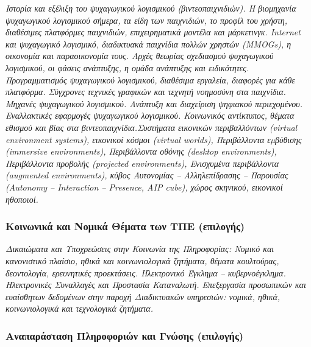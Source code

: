 \emph{Ιστορία και εξέλιξη του ψυχαγωγικού λογισμικού (βιντεοπαιχνιδιών).
Η βιομηχανία ψυχαγωγικού λογισμικού σήμερα, τα είδη των παιχνιδιών, το
προφίλ του χρήστη, διαθέσιμες πλατφόρμες παιχνιδιών, επιχειρηματικά
μοντέλα και μάρκετινγκ. Internet και ψυχαγωγικό λογισμικό, διαδικτυακά
παιχνίδια πολλών χρηστών (MMOGs), η οικονομία και παραοικονομία τους.
Αρχές θεωρίας σχεδιασμού ψυχαγωγικού λογισμικού, οι φάσεις ανάπτυξης, η
ομάδα ανάπτυξης και ειδικότητες. Προγραμματισμός ψυχαγωγικού λογισμικού,
διαθέσιμα εργαλεία, διαφορές για κάθε πλατφόρμα. Σύγχρονες τεχνικές
γραφικών και τεχνητή νοημοσύνη στα παιχνίδια. Μηχανές ψυχαγωγικού
λογισμικού. Ανάπτυξη και διαχείριση ψηφιακού περιεχομένου. Εναλλακτικές
εφαρμογές ψυχαγωγικού λογισμικού. Κοινωνικός αντίκτυπος, θέματα εθισμού
και βίας στα βιντεοπαιχνίδια.Συστήματα εικονικών περιβαλλόντων (virtual
environment systems), εικονικοί κόσμοι (virtual worlds), Περιβάλλοντα
εµβύθισης (immersive environments), Περιβάλλοντα οθόνης (desktop
environments), Περιβάλλοντα προβολής (projected environments),
Ενισχυμένα περιβάλλοντα (augmented environments), κύβος Αυτονομίας --
Αλληλεπίδρασης -- Παρουσίας (Autonomy -- Interaction -- Presence, AIP
cube), χώρος σκηνικού, εικονικοί ηθοποιοί.}

\hypertarget{ux3baux3bfux3b9ux3bdux3c9ux3bdux3b9ux3baux3ac-ux3baux3b1ux3b9-ux3bdux3bfux3bcux3b9ux3baux3ac-ux3b8ux3adux3bcux3b1ux3c4ux3b1-ux3c4ux3c9ux3bd-ux3c4ux3c0ux3b5-ux3b5ux3c0ux3b9ux3bbux3bfux3b3ux3aeux3c2}{%
\subsubsection{Κοινωνικά και Νομικά Θέματα των ΤΠΕ
(επιλογής)}\label{ux3baux3bfux3b9ux3bdux3c9ux3bdux3b9ux3baux3ac-ux3baux3b1ux3b9-ux3bdux3bfux3bcux3b9ux3baux3ac-ux3b8ux3adux3bcux3b1ux3c4ux3b1-ux3c4ux3c9ux3bd-ux3c4ux3c0ux3b5-ux3b5ux3c0ux3b9ux3bbux3bfux3b3ux3aeux3c2}}

\emph{Δικαιώματα και Υποχρεώσεις στην Κοινωνία της Πληροφορίας: Νομικό
και κανονιστικό πλαίσιο, ηθικά και κοινωνιολογικά ζητήματα, θέματα
κουλτούρας, δεοντολογία, ερευνητικές προεκτάσεις. Ηλεκτρονικό Έγκλημα --
κυβερνοέγκλημα. Ηλεκτρονικές Συναλλαγές και Προστασία Καταναλωτή.
Επεξεργασία προσωπικών και ευαίσθητων δεδομένων στην παροχή Διαδικτυακών
υπηρεσιών: νομικά, ηθικά, κοινωνιολογικά και τεχνολογικά ζητήματα.}

\hypertarget{ux3b1ux3bdux3b1ux3c0ux3b1ux3c1ux3acux3c3ux3c4ux3b1ux3c3ux3b7-ux3c0ux3bbux3b7ux3c1ux3bfux3c6ux3bfux3c1ux3b9ux3ceux3bd-ux3baux3b1ux3b9-ux3b3ux3bdux3ceux3c3ux3b7ux3c2-ux3b5ux3c0ux3b9ux3bbux3bfux3b3ux3aeux3c2}{%
\subsubsection{Αναπαράσταση Πληροφοριών και Γνώσης
(επιλογής)}\label{ux3b1ux3bdux3b1ux3c0ux3b1ux3c1ux3acux3c3ux3c4ux3b1ux3c3ux3b7-ux3c0ux3bbux3b7ux3c1ux3bfux3c6ux3bfux3c1ux3b9ux3ceux3bd-ux3baux3b1ux3b9-ux3b3ux3bdux3ceux3c3ux3b7ux3c2-ux3b5ux3c0ux3b9ux3bbux3bfux3b3ux3aeux3c2}}

